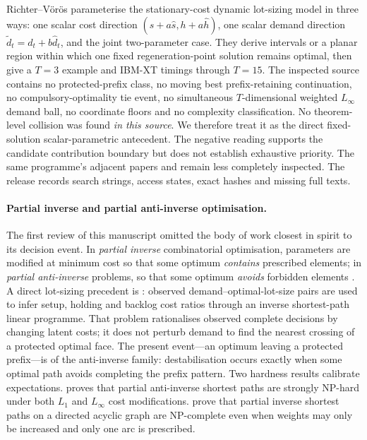 \documentclass[11pt]{article}
\theoremstyle{definition}
\begin{document}
Richter--V{\"o}r{\"o}s parameterise the stationary-cost dynamic lot-sizing model in three ways: one scalar cost direction $(s+a\hat s,h+a\hat h)$, one scalar demand direction $\widetilde d_t=d_t+b\widehat d_t$, and the joint two-parameter case. They derive intervals or a planar region within which one fixed regeneration-point solution remains optimal, then give a $T=3$ example and IBM-XT timings through $T=15$. The inspected source contains no protected-prefix class, no moving best prefix-retaining continuation, no compulsory-optimality tie event, no simultaneous $T$-dimensional weighted $L_\infty$ demand ball, no coordinate floors and no complexity classification. No theorem-level collision was found \emph{in this source}. We therefore treat it as the direct fixed-solution scalar-parametric antecedent. The negative reading supports the candidate contribution boundary but does not establish exhaustive priority. The same programme's adjacent papers \parencite{Richter1987,RichterVoros1989EJOR} and \textcite{RichterWeber1994} remain less completely inspected. The release records search strings, access states, exact hashes and missing full texts.

\paragraph{Partial inverse and partial anti-inverse optimisation.}
The first review of this manuscript omitted the body of work closest in spirit to its decision event. In \emph{partial inverse} combinatorial optimisation, parameters are modified at minimum cost so that some optimum \emph{contains} prescribed elements; in \emph{partial anti-inverse} problems, so that some optimum \emph{avoids} forbidden elements \parencite{Gassner2009,LeyMerkert2025}. A direct lot-sizing precedent is \textcite{EgriEtAl2014}: observed demand--optimal-lot-size pairs are used to infer setup, holding and backlog cost ratios through an inverse shortest-path linear programme. That problem rationalises observed complete decisions by changing latent costs; it does not perturb demand to find the nearest crossing of a protected optimal face. The present event---an optimum leaving a protected prefix---is of the anti-inverse family: destabilisation occurs exactly when some optimal path avoids completing the prefix pattern. Two hardness results calibrate expectations. \textcite{Gassner2009} proves that partial anti-inverse shortest paths are strongly NP-hard under both $L_1$ and $L_\infty$ cost modifications. \textcite{LeyMerkert2025} prove that partial inverse shortest paths on a directed acyclic graph are NP-complete even when weights may only be increased and only one arc is prescribed.
\end{document}
